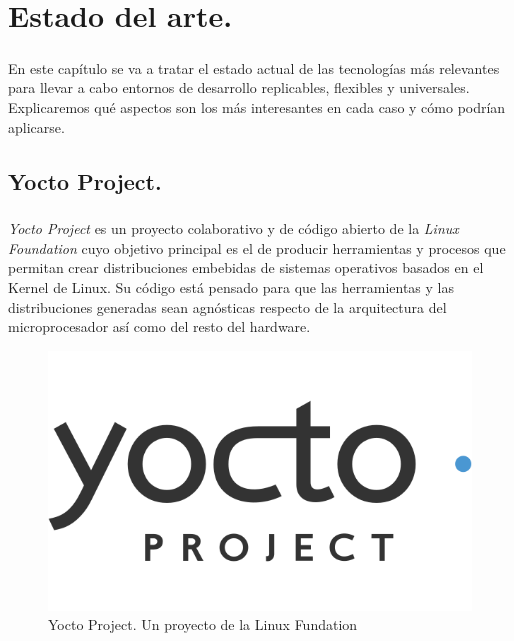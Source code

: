\chapter{Estado del arte.}\label{sec:estadodelarte}

\paragraph{}En este capítulo se va a tratar el estado actual de las tecnologías
más relevantes para llevar a cabo entornos de desarrollo replicables, flexibles y universales.
Explicaremos qué aspectos son los más interesantes en cada caso y cómo podrían aplicarse.

\section{Yocto Project.}\label{sec:yocto}

\paragraph{} \emph{Yocto Project} es un proyecto colaborativo y de código abierto
de la \emph{Linux Foundation} cuyo objetivo principal es el de producir herramientas y
procesos que permitan crear distribuciones embebidas de sistemas operativos basados
en el Kernel de Linux. Su código está pensado para que las herramientas y las distribuciones
generadas sean agnósticas respecto de la arquitectura del microprocesador así como del
resto del hardware.
\cite{yoctoprojectpage}

\begin{figure}[h]
	\centering
	\includegraphics[width=0.35\linewidth]{imgs/yocto-logo}
	\caption[Logo Yocto Project]{Yocto Project. Un proyecto de la Linux Fundation}
	\label{fig:yocto_logo}
\end{figure}

